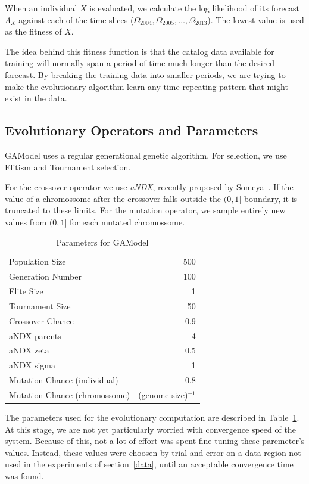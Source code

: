 \documentclass{sig-alternate}
\begin{document}
When an individual $X$ is evaluated, we calculate the log likelihood
of its forecast $\Lambda_X$ against each of the time slices
($\Omega_{2004}, \Omega_{2005}, \dots, \Omega_{2013}$). The lowest
value is used as the fitness of $X$.

The idea behind this fitness function is that the catalog data
available for training will normally span a period of time much longer
than the desired forecast. By breaking the training data into smaller
periods, we are trying to make the evolutionary algorithm learn any
time-repeating pattern that might exist in the data.

\subsection{Evolutionary Operators and Parameters}

GAModel uses a regular generational genetic algorithm. For selection,
we use Elitism and Tournament selection. 

For the crossover operator we use \emph{aNDX}, recently proposed by
Someya~\cite{Someya2013}. If the value of a chromossome after the
crossover falls outside the $(0,1]$ boundary, it is truncated to these
  limits. For the mutation operator, we sample entirely new values
  from $(0,1]$ for each mutated chromossome.

\begin{table}[!h]
  \begin{center}
  \begin{tabular}{|l|r|}
    \hline
    Population Size & 500\\
    Generation Number & 100\\
    Elite Size & 1\\
    Tournament Size & 50\\
    Crossover Chance & 0.9\\
    aNDX parents & 4\\
    aNDX zeta & 0.5\\
    aNDX sigma & 1\\
    Mutation Chance (individual) & 0.8\\
    Mutation Chance (chromossome) & (genome size)$^{-1}$\\
    \hline    
  \end{tabular}
  \end{center}
  \caption{Parameters for GAModel}
  \label{GAParameters}
\end{table}

The parameters used for the evolutionary computation are described in
Table~\ref{GAParameters}. At this stage, we are not yet particularly
worried with convergence speed of the system. Because of this, not a
lot of effort was spent fine tuning these paremeter's values. Instead,
these values were choosen by trial and error on a data region not used
in the experiments of section~\ref{data}, until an acceptable
convergence time was found.
\end{document}
